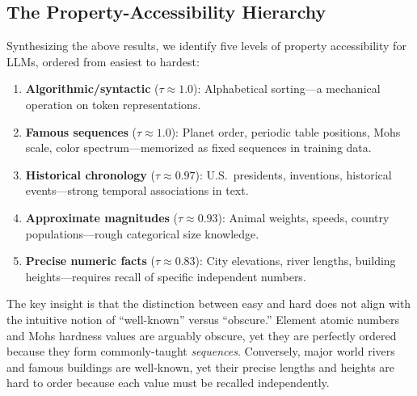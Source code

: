 \subsection{The Property-Accessibility Hierarchy}
\label{sec:hierarchy}

Synthesizing the above results, we identify five levels of property accessibility for LLMs, ordered from easiest to hardest:

\begin{enumerate}[leftmargin=*,itemsep=0pt,topsep=0pt]
    \item \textbf{Algorithmic/syntactic} ($\tau \approx 1.0$): Alphabetical sorting---a mechanical operation on token representations.
    \item \textbf{Famous sequences} ($\tau \approx 1.0$): Planet order, periodic table positions, Mohs scale, color spectrum---memorized as fixed sequences in training data.
    \item \textbf{Historical chronology} ($\tau \approx 0.97$): U.S.\ presidents, inventions, historical events---strong temporal associations in text.
    \item \textbf{Approximate magnitudes} ($\tau \approx 0.93$): Animal weights, speeds, country populations---rough categorical size knowledge.
    \item \textbf{Precise numeric facts} ($\tau \approx 0.83$): City elevations, river lengths, building heights---requires recall of specific independent numbers.
\end{enumerate}

The key insight is that the distinction between easy and hard does not align with the intuitive notion of ``well-known'' versus ``obscure.''
Element atomic numbers and Mohs hardness values are arguably obscure, yet they are perfectly ordered because they form commonly-taught \emph{sequences}.
Conversely, major world rivers and famous buildings are well-known, yet their precise lengths and heights are hard to order because each value must be recalled independently.

